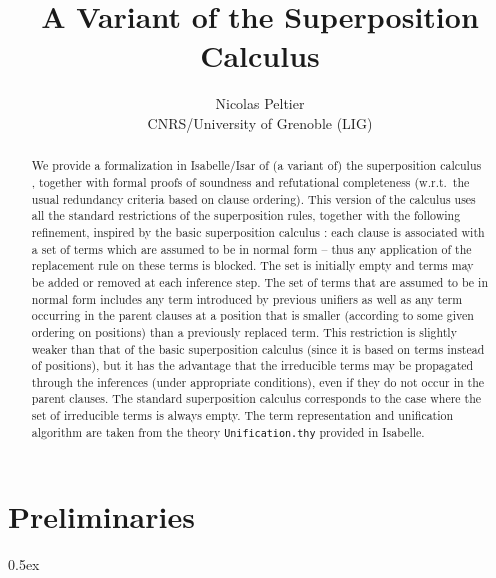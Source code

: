 \documentclass[11pt,a4paper]{article}
\begin{document}
\title{A Variant of the Superposition Calculus}
\author{Nicolas Peltier\\ CNRS/University of Grenoble (LIG)}
\maketitle

\begin{abstract}
We provide a formalization in Isabelle/Isar of (a variant of) the superposition calculus \cite{BG94,DBLP:books/el/RV01/NieuwenhuisR01}, together with formal proofs of soundness and refutational completeness (w.r.t.\ the usual redundancy criteria based on clause ordering).
This version of the calculus uses all the standard restrictions of the superposition rules, together with the following refinement, inspired by the basic superposition calculus \cite{DBLP:conf/cade/BachmairGLS92,DBLP:journals/iandc/BachmairGLS95}:
each clause is associated with a set of terms which are assumed to be in normal form -- thus any application
of the replacement rule on these terms is blocked.
The set is initially empty and terms may be added or removed at each inference step.
The set of terms that are assumed to be in normal form includes 
any term introduced by previous unifiers as well as any term occurring in the parent clauses at a position that is smaller (according to some given ordering on positions) than a previously replaced term. This
restriction is slightly weaker than that of the basic superposition calculus (since it is based on terms instead of positions), but
 it has the advantage that the irreducible terms may be propagated through the inferences (under appropriate conditions), even if they do not occur in the parent clauses. The standard superposition calculus corresponds to the case where the set of irreducible terms is always empty.
The term representation and unification algorithm are taken from the theory {\tt Unification.thy} provided in Isabelle.
\end{abstract}

\tableofcontents

\newpage

\section{Preliminaries}

\parindent 0pt\parskip 0.5ex



%
%



\end{document}

